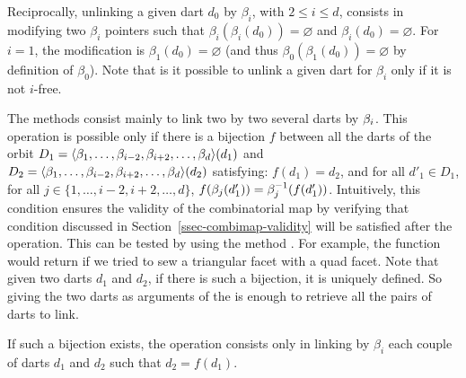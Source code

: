 Reciprocally, unlinking a given dart $d_0$ by $\beta_i$, with $2\leq
i\leq d$, consists in modifying two $\beta_i$ pointers
such that $\beta_i(\beta_i(d_0))=\varnothing$ and
$\beta_i(d_0)=\varnothing$.  For $i=1$, the modification is
$\beta_1(d_0)=\varnothing$ (and thus
$\beta_0(\beta_1(d_0))=\varnothing$ by definition of $\beta_0$).  Note
that is it possible to unlink a given dart for $\beta_i$ only if it is
not $i$-free.

The  methods consist mainly to link two by two
several darts by $\beta_{i}$. This operation is possible only if there is
a bijection $f$ between all the darts of the orbit
$D_1=\langle{}\beta_{1},\ldots,\beta_{i-2},\beta_{i+2},\ldots,\beta_{d}\rangle{}(d_1)$ and
$D_2=\langle{}\beta_{1},\ldots,\beta_{i-2},\beta_{i+2},\ldots,\beta_{d}\rangle{}(d_2)$
satisfying: $f(d_1)=d_2$, and for all $d'_1 \in D_1$, for all $j\in
\{1,\ldots,i-2,i+2,\ldots,d\}$,
$f(\beta_{j}(d'_1))=\beta_{j}^{-1}(f(d'_1))$.  Intuitively, this condition
ensures the validity of the combinatorial map by verifying that
condition discussed in Section~\ref{ssec-combimap-validity} will be
satisfied after the operation.  This can be tested by using the method
. For example, the function
 would return  if we tried to sew a
triangular facet with a quad facet. Note that given two darts $d_1$
and $d_2$, if there is such a bijection, it is uniquely defined. So giving
the two darts as arguments of the  is enough to retrieve
all the pairs of darts to link.

If such a bijection exists, the  operation
consists only in linking by $\beta_i$ each couple of darts $d_1$ and
$d_2$ such that $d_2=f(d_1)$.



